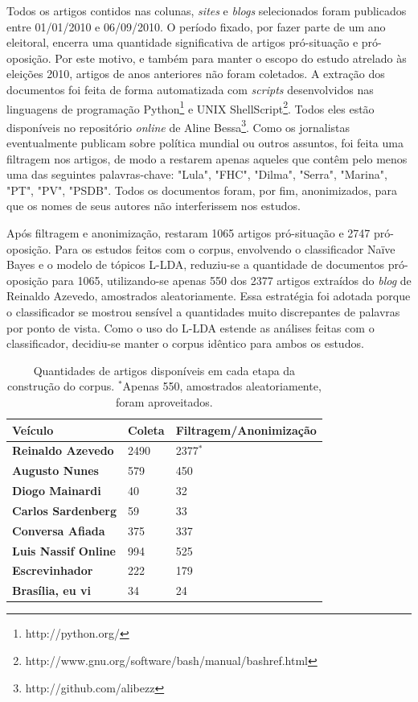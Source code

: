 Todos os artigos contidos nas colunas, \emph{sites} e \emph{blogs} selecionados foram  publicados entre 01/01/2010 e 06/09/2010. O período fixado, por fazer parte de um ano eleitoral, encerra uma quantidade significativa de artigos pró-situação e pró-oposição. Por este motivo, e também para manter o escopo do estudo atrelado às eleições 2010, artigos de anos anteriores não foram coletados. A extração dos documentos foi feita de forma automatizada com \emph{scripts} desenvolvidos nas linguagens de programação Python\footnote{http://python.org/} e UNIX ShellScript\footnote{http://www.gnu.org/software/bash/manual/bashref.html}. Todos eles estão disponíveis no repositório \emph{online} de Aline Bessa\footnote{http://github.com/alibezz}. Como os jornalistas eventualmente publicam sobre política mundial ou outros assuntos, foi feita uma filtragem nos artigos, de modo a restarem apenas aqueles que contêm pelo menos uma das seguintes palavras-chave: "Lula", "FHC", "Dilma", "Serra", "Marina", "PT", "PV", "PSDB". Todos os documentos foram, por fim, anonimizados, para que os nomes de seus autores não interferissem nos estudos. 

Após filtragem e anonimização, restaram 1065 artigos pró-situação e 2747 pró-oposição. Para os estudos feitos com o corpus, envolvendo o classificador Naïve Bayes e o modelo de tópicos L-LDA, reduziu-se a quantidade de documentos pró-oposição para 1065, utilizando-se apenas 550 dos 2377 artigos extraídos do \emph{blog} de Reinaldo Azevedo, amostrados aleatoriamente. Essa estratégia foi adotada porque o classificador se mostrou sensível a quantidades muito discrepantes de palavras por ponto de vista. Como o uso do L-LDA estende as análises feitas com o classificador, decidiu-se manter o corpus idêntico para ambos os estudos. 

\begin{table}[t]
\centering
\begin{tabular}{| l | l | p{5cm} | }
\hline

\textbf{Veículo} & \textbf{Coleta} & \textbf{Filtragem/Anonimização} \\ \hline

\textbf{Reinaldo Azevedo} & 2490 & 2377\ensuremath{^*} \\ \hline
\textbf{Augusto Nunes} & 579 & 450 \\ \hline
\textbf{Diogo Mainardi} & 40 & 32 \\ \hline
\textbf{Carlos Sardenberg} & 59 & 33  \\ \hline
\textbf{Conversa Afiada} & 375 & 337  \\ \hline
\textbf{Luis Nassif Online} & 994 & 525 \\ \hline
\textbf{Escrevinhador} & 222 & 179  \\ \hline
\textbf{Brasília, eu vi} & 34 & 24  \\ \hline
\end{tabular}
\label{tab1:estudo}
\caption{Quantidades de artigos disponíveis em cada etapa da construção do corpus. \ensuremath{^*}Apenas 550, amostrados aleatoriamente, foram aproveitados.}
\end{table}

